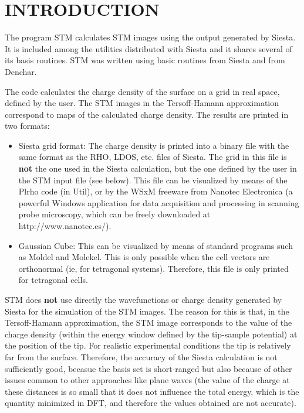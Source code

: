 
\tableofcontents

\newpage



\section{INTRODUCTION}

The program {\sc STM} calculates STM images using the output
generated by {\sc Siesta}.
It is included among the utilities distributed with {\sc Siesta}
and it shares several of its basis routines. 
{\sc STM} was written using basic routines from 
{\sc Siesta} and from {\sc Denchar}.

The code calculates the charge density of the surface
on a grid in real space, defined by the user. The STM images
in the Tersoff-Hamann approximation correspond to maps of
the calculated charge density. 
The results are printed in two formats:

\begin{itemize} 

\item{{\sc Siesta} grid format:}
The charge density is printed into a binary file with the same
format as the RHO, LDOS, etc. files of {\sc Siesta}. The grid
in this file is {\bf not} the one used in the {\sc Siesta}
calculation, but the one defined by the user in the {\sc STM}
input file (see below).
This file can be visualized by means of the {\sc Plrho}
code (in Util), or by the WSxM freeware from Nanotec Electronica
(a powerful Windows application for data 
acquisition and processing in scanning probe microscopy,
which can be freely downloaded at http://www.nanotec.es/).


\item{Gaussian Cube:}
This can be visualized by means of standard programs
such as {\sc Moldel} and {\sc Molekel}. This is only possible
when the cell vectors are orthonormal (ie, for tetragonal systems).
Therefore, this file is only printed for tetragonal cells.

\end{itemize}

{\sc STM} does {\bf not} use directly the wavefunctions or charge density
generated by {\sc Siesta} for the simulation of the STM images. The
reason for this is that, in the Tersoff-Hamann approximation,
the STM image corresponds to the value of the charge density
(within the energy window defined by the tip-sample potential)
at the position of the tip. For realistic experimental conditions
the tip is relatively far from the surface. Therefore, the accuracy
of the {\sc Siesta} calculation is not sufficiently good, becasue
the basis set is short-ranged but also because of other issues
common to other approaches like plane waves (the value of the charge
at these distances is so small that it does not influence the
total energy, which is the quantity minimized in DFT, and therefore
the values obtained are not accurate).

